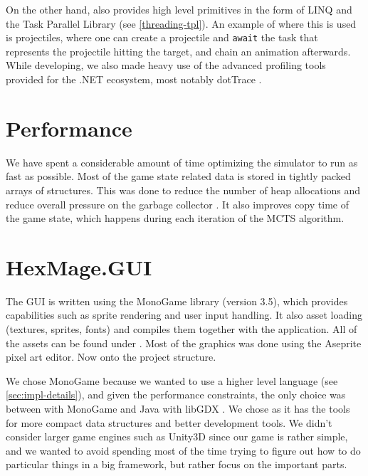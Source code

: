 On the other hand, \Csh{} also provides high level primitives in the form of LINQ and the Task Parallel Library \citep{tpl} (see \autoref{threading-tpl}). An example of where this is used is projectiles, where one can create a projectile and \verb|await| the task that represents the projectile hitting the target, and chain an animation afterwards. While developing, we also made heavy use of the advanced profiling tools provided for the .NET ecosystem, most notably dotTrace \citep{dot-trace}.

\section{Performance}

We have spent a considerable amount of time optimizing the simulator to run as fast as possible. Most of the game state related data is stored in tightly packed arrays of structures. This was done to reduce the number of heap allocations and reduce overall pressure on the garbage collector \citep{highperf-dotnet}. It also improves copy time of the game state, which happens during each iteration of the MCTS algorithm.



\section{HexMage.GUI}


The GUI is written using the MonoGame \citep{monogame} library (version 3.5), which provides capabilities such as sprite rendering and user input handling. It also asset loading (textures, sprites, fonts) and compiles them together with the application. All of the assets can be found under . Most of the graphics was done using the Aseprite \citep{aseprite} pixel art editor. Now onto the project structure.

We chose MonoGame because we wanted to use a higher level language (see \autoref{sec:impl-details}), and given the performance constraints, the only choice was between \Csh with MonoGame and Java with libGDX \citep{libgdx}. We chose \Csh as it has the tools for more compact data structures and better development tools. We didn't consider larger game engines such as Unity3D \citep{unity3d} since our game is rather simple, and we wanted to avoid spending most of the time trying to figure out how to do particular things in a big framework, but rather focus on the important parts.

